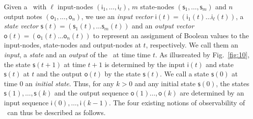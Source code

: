 Given a \BCN\ with $\ell$ input-nodes $(\mathsf{i}_1,\ldots, \mathsf{i}_\ell)$, $m$ state-nodes $(\mathsf{s}_1,\ldots, \mathsf{s}_m)$ and $n$ output notes  $(\mathsf{o}_1,\ldots, \mathsf{o}_n)$,  we use an {\em input vector} $\mathsf{i}(t)=(\mathsf{i}_1(t)\ldots\mathsf{i}_\ell (t))$, a {\em state vector} $\mathsf{s}(t)=(\mathsf{s}_1(t), \ldots \mathsf{s}_m(t))$ and an {\em output  vector} $\mathsf{o}(t)=(\mathsf{o}_1(t) \ldots \mathsf{o}_n(t))$  to represent an assignment of Boolean values to the  input-nodes, state-nodes and  output-nodes at $t$, respectively.  We call them an {\em input}, a {\em state} and an {\em output} of the \BCN\ at time time $t$. As  illusreated by Fig.~\ref{fig:10},  the state $\mathsf{s}(t+1)$ at time $t+1$ is determined by the input   $\mathsf{i}(t)$ and state $\mathsf{s}(t)$ at $t$  and the output   $\mathsf{o}(t)$ by the state  $\mathsf{s}(t)$.  We call a state $\mathsf{s}(0)$ at time $0$ an {\em initial state}. Thus, for any $k>0$ and any  initial state $\mathsf{s}(0)$, the states  $\mathsf{s}(1),\ldots, \mathsf{s}(k)$ and the output sequence $\mathsf{o}(1)\ldots, \mathsf{o}(k)$ are  determined by an  input sequence $\mathsf{i}(0),\ldots, \mathsf{i}(k-1)$.
%
The four existing notions of observability of \BCNs\ can thus be described as follows. 
